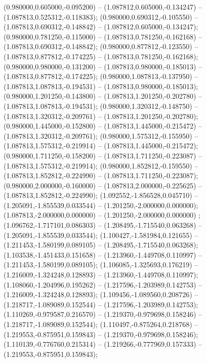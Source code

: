  (0.980000,0.605000,-0.095200) -- (1.087812,0.605000,-0.134247) -- (1.087813,0.525312,-0.118383);
 (0.980000,0.690312,-0.105550) -- (1.087813,0.690312,-0.148842) -- (1.087812,0.605000,-0.134247);
 (0.980000,0.781250,-0.115000) -- (1.087813,0.781250,-0.162168) -- (1.087813,0.690312,-0.148842);
 (0.980000,0.877812,-0.123550) -- (1.087813,0.877812,-0.174225) -- (1.087813,0.781250,-0.162168);
 (0.980000,0.980000,-0.131200) -- (1.087813,0.980000,-0.185013) -- (1.087813,0.877812,-0.174225);
 (0.980000,1.087813,-0.137950) -- (1.087813,1.087813,-0.194531) -- (1.087813,0.980000,-0.185013);
 (0.980000,1.201250,-0.143800) -- (1.087813,1.201250,-0.202780) -- (1.087813,1.087813,-0.194531);
 (0.980000,1.320312,-0.148750) -- (1.087813,1.320312,-0.209761) -- (1.087813,1.201250,-0.202780);
 (0.980000,1.445000,-0.152800) -- (1.087813,1.445000,-0.215472) -- (1.087813,1.320312,-0.209761);
 (0.980000,1.575312,-0.155950) -- (1.087813,1.575312,-0.219914) -- (1.087813,1.445000,-0.215472);
 (0.980000,1.711250,-0.158200) -- (1.087813,1.711250,-0.223087) -- (1.087813,1.575312,-0.219914);
 (0.980000,1.852812,-0.159550) -- (1.087813,1.852812,-0.224990) -- (1.087813,1.711250,-0.223087);
 (0.980000,2.000000,-0.160000) -- (1.087813,2.000000,-0.225625) -- (1.087813,1.852812,-0.224990);
 (1.092552,-1.856528,0.045710) -- (1.205091,-1.855539,0.033544) -- (1.201250,-2.000000,0.000000);
 (1.087813,-2.000000,0.000000) -- (1.201250,-2.000000,0.000000) ;
 (1.096762,-1.717101,0.086303) -- (1.208495,-1.715540,0.063268) -- (1.205091,-1.855539,0.033544);
 (1.100427,-1.581984,0.121655) -- (1.211453,-1.580199,0.089105) -- (1.208495,-1.715540,0.063268);
 (1.103538,-1.451433,0.151658) -- (1.213960,-1.449708,0.110997) -- (1.211453,-1.580199,0.089105);
 (1.106085,-1.325693,0.176219) -- (1.216009,-1.324248,0.128893) -- (1.213960,-1.449708,0.110997);
 (1.108060,-1.204996,0.195262) -- (1.217596,-1.203989,0.142753) -- (1.216009,-1.324248,0.128893);
 (1.109456,-1.089560,0.208726) -- (1.218717,-1.089089,0.152544) -- (1.217596,-1.203989,0.142753);
 (1.110269,-0.979587,0.216570) -- (1.219370,-0.979698,0.158246) -- (1.218717,-1.089089,0.152544);
 (1.110497,-0.875264,0.218768) -- (1.219553,-0.875951,0.159843) -- (1.219370,-0.979698,0.158246);
 (1.110139,-0.776760,0.215314) -- (1.219266,-0.777969,0.157333) -- (1.219553,-0.875951,0.159843);
